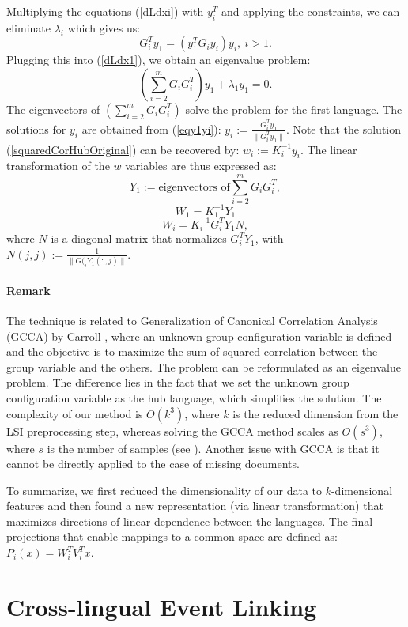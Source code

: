 \documentclass[twoside,11pt]{article}
\begin{document}
Multiplying the equations (\ref{dLdxi}) with $y_i^T$ and applying the constraints, we can eliminate $\lambda_i$ which gives us:
\begin{equation}\label{eqy1yi}
G_{i}^T y_1 = \left(y_1^T G_{i} y_i \right) y_i,~i > 1.
\end{equation}
Plugging this into (\ref{dLdx1}), we obtain an eigenvalue problem:
$$\left( \sum_{i = 2}^m G_i G_{i}^T \right) y_1 + \lambda_1 y_1 = 0.$$
The eigenvectors of $\left( \sum_{i = 2}^m G_i G_{i}^T \right)$ solve the problem for the first language. The solutions for $y_i$ are obtained from (\ref{eqy1yi}): $y_i := \frac{G_{i}^T y_1}{\| G_{i}^T y_1 \|}$.
Note that the solution (\ref{squaredCorHubOriginal}) can be recovered by: $w_i := K_i^{-1} y_i$. The linear transformation of the $w$ variables are thus expressed as:
$$ Y_1 := \text{eigenvectors of} \sum_{i = 2}^m G_i G_{i}^T, $$
$$ W_1 = K_1^{-1} Y_1 $$
$$ W_i = K_i^{-1} G_{i}^T Y_1 N,$$
where $N$ is a diagonal matrix that normalizes $G_{i}^T Y_1$, with $N(j,j) := \frac{1}{\|G(_{i} Y_1(:,j)\|}$.

\paragraph{Remark}
 The technique is related to  Generalization of Canonical Correlation Analysis (GCCA) by Carroll \citeyear{Carroll}, where an unknown group configuration variable is defined and the objective is to maximize the sum of squared correlation between the group variable and the others. The problem can be reformulated as an eigenvalue problem. The difference lies in the fact that we set the unknown group configuration variable as the hub language, which simplifies the solution. The complexity of our method is $O(k^3)$, where $k$ is the reduced dimension from the LSI preprocessing step, whereas solving the GCCA method scales as $O(s^3)$, where $s$ is the number of samples (see \cite{gifi}). Another issue with GCCA is that it cannot be directly applied to the case of missing documents.

To summarize, we first reduced the dimensionality of our data to $k$-dimensional features and then found a new representation (via linear transformation) that maximizes directions of linear dependence between the languages. The final projections that enable mappings to a common space are defined as: $P_i(x) = W_i^T V_i^T x.$


\section{Cross-lingual Event Linking}\label{sec:linking}
\end{document}

